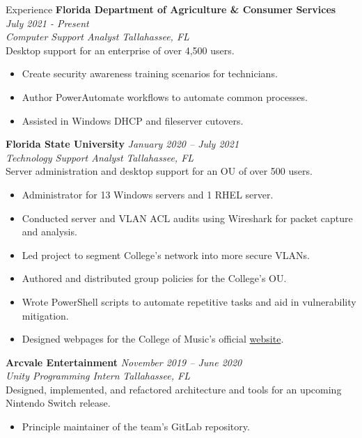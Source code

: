 \documentclass{resume} %
\begin{document}
	\begin{rSection}{Experience}
		{\bf Florida Department of Agriculture \& Consumer Services} \hfill {\em July 2021 - Present}\\
		\textit{Computer Support Analyst} \hfill {\em Tallahassee, FL} \\
		Desktop support for an enterprise of over 4,500 users.
		\begin{itemize}
			\vspace{-0.2cm} \item Create security awareness training scenarios for technicians.
			\vspace{-0.2cm} \item Author PowerAutomate workflows to automate common processes.
			\vspace{-0.2cm} \item Assisted in Windows DHCP and fileserver cutovers.
		\end{itemize}
		{\bf Florida State University} \hfill {\em January 2020 – July 2021} \\
		\textit{Technology Support Analyst} \hfill {\em Tallahassee, FL} \smallskip \\
		Server administration and desktop support for an OU of over 500 users.
		\begin{itemize}
			\vspace{-0.2cm} \item Administrator for 13 Windows servers and 1 RHEL server.
			\vspace{-0.2cm} \item Conducted server and VLAN ACL audits using Wireshark for packet capture and analysis.
			\vspace{-0.2cm} \item Led project to segment College's network into more secure VLANs.\vspace{-0.2cm} \item Authored and distributed group policies for the College's OU.
			\vspace{-0.2cm} \item Wrote PowerShell scripts to automate repetitive tasks and aid in vulnerability mitigation.\vspace{-0.2cm} \item Designed webpages for the College of Music's official {\color{cyan} \href{https://music.fsu.edu/ensembles/orchestras/audition-information-orchestras}{website}}.
		\end{itemize}
		{\bf Arcvale Entertainment} \hfill {\em November 2019 – June 2020}\\
		\textit{Unity Programming Intern} \hfill {\em Tallahassee, FL} \smallskip \\
		Designed, implemented, and refactored architecture and tools for an upcoming Nintendo Switch release.
		\begin{itemize}
			\vspace{-0.2cm} \item Principle maintainer of the team's GitLab repository.
		\end{itemize}
	\end{rSection}
	
\end{document}
